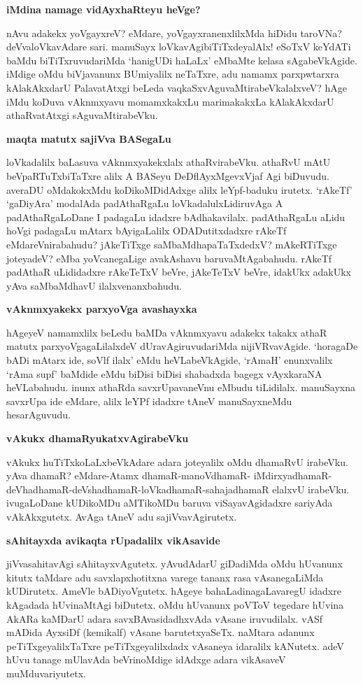 \noindent
\textbf{iMdina namage vidAyxhaRteyu heVge?}\label{page109}

nAvu adakekx yoVgayxreV? eMdare, yoVgayxranenxlilxMda hiDidu taroVNa? 
deVvaloVkavAdare sari. manuSayx loVkavAgibiTiTxdeyalAlx! eSoTxV keYdATi baMdu biTiTxruvudariMda `hanigUDi haLaLx' eMbaMte kelasa sAgabeVkAgide. iMdige oMdu biVjavanunx BUmiyalilx neTaTxre, adu namamx parxpwtarxra kAlakAkxdarU PalavatAtxgi beLeda vaqkaSxvAguvaMtirabeVkalalxveV? hAge iMdu koDuva vAknmxyavu momamxkakxLu marimakakxLa kAlakAkxdarU athaRvatAtxgi sAguvaMtirabeVku.

\noindent
\textbf{maqta matutx sajiVva BASegaLu}\label{page109}

loVkadalilx baLasuva vAknmxyakekxlalx athaRvirabeVku. athaRvU mAtU 
beVpaRTuTxbiTaTxre alilx A BASeyu DeDflAyxMgevxVjaf Agi biDuvudu. 
averaDU oMdakokxMdu koDikoMDidAdxge alilx leYpf-baduku irutetx. `rAkeTf' `gaDiyAra' modalAda padAthaRgaLu loVkadalulxLidiruvAga A padAthaRgaLoDane I padagaLu idadxre bAdhakavilalx. padAthaRgaLu aLidu hoVgi padagaLu mAtarx bAyigaLalilx ODADutitxdadxre rAkeTf eMdareVnirabahudu? jAkeTiTxge saMbaMdhapaTaTxdedxV? mAkeRTiTxge joteyadeV? eMba yoVcanegaLige avakAshavu baruvaMtAgabahudu. rAkeTf padAthaR uLididadxre rAkeTeTxV beVre, jAkeTeTxV beVre, idakUkx adakUkx yAva saMbaMdhavU ilalxvenanxbahudu.

\noindent
\textbf{vAknmxyakekx parxyoVga avashayxka}\label{page110}

hAgeyeV namamxlilx beLedu baMDa vAknmxyavu adakekx takakx athaR matutx parxyoVgagaLilalxdeV dUravAgiruvudariMda nijiVRvavAgide. `horagaDe bADi mAtarx ide, soVlf ilalx' eMdu heVLabeVkAgide, `rAmaH' enunxvalilx `rAma supf' baMdide eMdu biDisi biDisi shabadxda bagegx vAyxkaraNA heVLabahudu. inunx athaRda savxrUpavaneVnu eMbudu tiLidilalx. manuSayxna savxrUpa ide eMdare, alilx leYPf idadxre tAneV manuSayxneMdu hesarAguvudu.

\noindent
\textbf{vAkukx dhamaRyukatxvAgirabeVku}\label{page110}

vAkukx huTiTxkoLaLxbeVkAdare adara joteyalilx oMdu dhamaRvU irabeVku. 
yAva dhamaR? eMdare-Atamx dhamaR-manoVdhamaR- 
iMdirxyadhamaR-deVhadhamaR-deVshadhamaR-loVkadhamaR-sahajadhamaR elalxvU irabeVku. ivugaLoDane kUDikoMDu aMTikoMDu baruva viSayavAgidadxre sariyAda vAkAkxgutetx. AvAga tAneV adu sajiVvavAgirutetx. 

\noindent
\textbf{sAhitayxda avikaqta rUpadalilx vikAsavide}\label{page110}

jiVvasahitavAgi sAhitayxvAgutetx. yAvudAdarU giDadiMda oMdu hUvanunx kitutx taMdare adu savxlapxhotitxna varege tananx rasa vAsanegaLiMda kUDirutetx. AmeVle bADiyoVgutetx. hAgeye bahaLadinagaLavaregU idadxre kAgadada hUvinaMtAgi biDutetx. oMdu hUvanunx poVToV tegedare hUvina AkARa kaMDarU adara savxBAvasidadhxvAda vAsane iruvudilalx. vASf mADida AyxsiDf (kemikalf) vAsane barutetxyaSeTx. naMtara adanunx peTiTxgeyalilxTaTxre peTiTxgeyalilxdadx vAsaneya idaralilx kANutetx. adeV hUvu tanage mUlavAda beVrinoMdige idAdxge adara vikAsaveV muMduvariyutetx.

